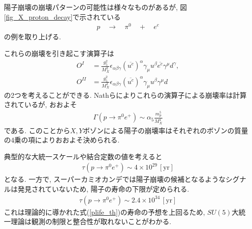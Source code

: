 陽子崩壊の崩壊パターンの可能性は様々なものがあるが, 図\ref{fig_X_proton_decay}で示されている
\begin{align}
  p \quad \longrightarrow\quad \pi^0 \quad + \quad e^c\nonumber
\end{align}
の例を取り上げる.

これらの崩壊を引き起こす演算子は
\begin{align}
  O^{I} &= \frac{g_5^2}{M_X^2} \epsilon_{\alpha\beta\gamma} (\overline{u^c})^\alpha \gamma_\mu u^\beta \overline{e^c}\gamma^\mu d^\gamma,\nonumber\\
  O^{II} &= \frac{g_5^2}{M_X^2} \epsilon_{\alpha\beta\gamma} (\overline{u^c})^\alpha \gamma_\mu u^\beta  \gamma^\mu d\nonumber
\end{align}
の2つを考えることができる. Nathらにより\cite{nathProtonStabilityGrand2007}これらの演算子による崩壊率は計算されているが, おおよそ
\begin{align}
  \Gamma(p\rightarrow \pi^0 e^+) \sim \alpha_5 \frac{m_p^5}{M_X^4}\label{decayrate}
\end{align}
である.
このことから$X,Y$ボゾンによる陽子の崩壊率はそれぞれのボゾンの質量の4乗の項によりおおよそ決められる.

典型的な大統一スケールや結合定数の値を考えると
\begin{align}
  \tau(p\rightarrow \pi^0 e^+) \sim 4\times 10^{29} \,[\mathrm{yr}] \label{plife_th}
\end{align}
となる.
一方で, スーパーカミオカンデでは陽子崩壊の候補となるようなシグナルは発見されていないため, 陽子の寿命の下限が定められる\cite{collaborationSearchProtonDecay2020}.
\begin{align}
  \tau(p\rightarrow \pi^0 e^+) \sim 2.4\times10^{34}\,[\mathrm{yr}]\nonumber
\end{align}
これは理論的に導かれた式(\ref{plife_th})の寿命の予想を上回るため, $SU(5)$大統一理論は観測の制限と整合性が取れないことがわかる.
\begin{comment}
\subsection{電荷の量子化}
式(\ref{quantum_Q})で述べているが, 標準模型では予言されない電荷の量子化が行える.
これは$SU(5)$大統一理論がクォーク, レプトンを $SU(5)$の単純群で記述し, 式(\ref{GUT-5rep})のように$\overline{\bm{5}}$表現に当てはめることで
\begin{align}
  \mathrm{Tr}Q = 0 \nonumber
\end{align}
と標準模型では与えられない条件を満足させているためである.
\end{comment}
